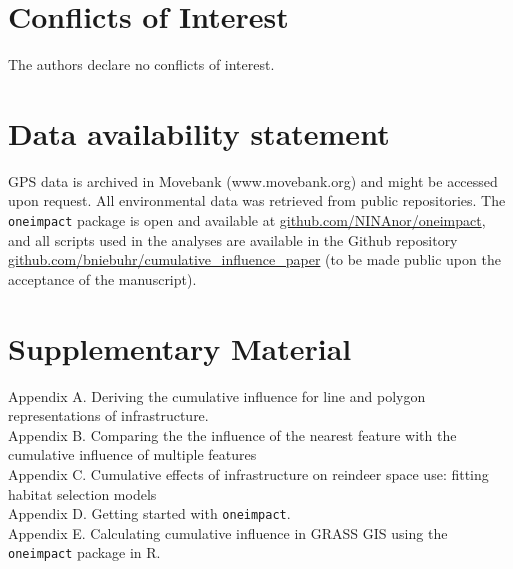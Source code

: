 \documentclass[titlepage]{article}
\begin{document}
\section*{Conflicts of Interest}

The authors declare no conflicts of interest.

\section*{Data availability statement}

GPS data is archived in Movebank (www.movebank.org) and might be accessed upon request. All environmental data was retrieved from public repositories. The \verb|oneimpact| package is open and available at \url{github.com/NINAnor/oneimpact}, and all scripts used in the analyses are available in the Github repository \url{github.com/bniebuhr/cumulative_influence_paper} (to be made public upon the acceptance of the manuscript).

\section*{Supplementary Material}

Appendix A. Deriving the cumulative influence for line and polygon representations of infrastructure. \\
Appendix B. Comparing the the influence of the nearest feature with the cumulative influence of multiple features \\
Appendix C. Cumulative effects of infrastructure on reindeer space use: fitting habitat selection models \\
Appendix D. Getting started with \verb|oneimpact|. \\
Appendix E. Calculating cumulative influence in GRASS GIS using the \verb|oneimpact| package in R.



\end{document}
